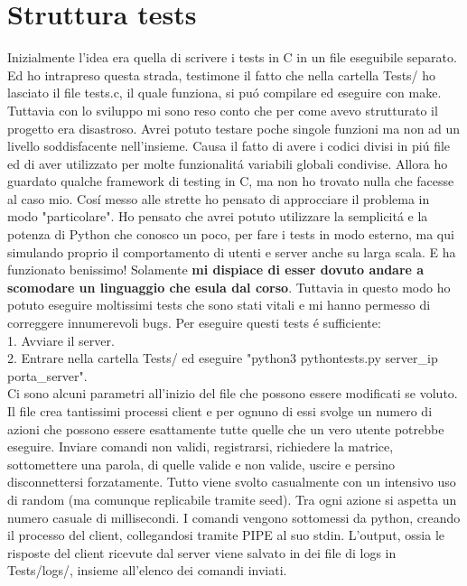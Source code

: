 \chapter{Struttura tests}{\label{ch:strutturatests}}
Inizialmente l'idea era quella di scrivere i tests in C in un file eseguibile separato. Ed ho intrapreso questa strada, testimone il fatto che nella cartella Tests/ ho lasciato il file tests.c, il quale funziona, si pu\'o compilare ed eseguire con make. Tuttavia con lo sviluppo mi sono reso conto che per come avevo strutturato il progetto era disastroso. Avrei potuto testare poche singole funzioni ma non ad un livello soddisfacente nell'insieme. Causa il fatto di avere i codici divisi in pi\'u file ed di aver utilizzato per molte funzionalit\'a variabili globali condivise. Allora ho guardato qualche framework di testing in C, ma non ho trovato nulla che facesse al caso mio. Cos\'i messo alle strette ho pensato di approcciare il problema in modo "particolare". Ho pensato che avrei potuto utilizzare la semplicit\'a e la potenza di Python che conosco un poco, per fare i tests in modo esterno, ma qui simulando proprio il comportamento di utenti e server anche su larga scala. E ha funzionato benissimo! Solamente \textbf{mi dispiace di esser dovuto andare a scomodare un linguaggio che esula dal corso}. Tuttavia in questo modo ho potuto eseguire moltissimi tests che sono stati vitali e mi hanno permesso di correggere innumerevoli bugs. Per eseguire questi tests \'e sufficiente:
\\
1. Avviare il server.
\\
2. Entrare nella cartella Tests/ ed eseguire "python3 pythontests.py server\_ip porta\_server".
\\
Ci sono alcuni parametri all'inizio del file che possono essere modificati se voluto.
\\
Il file crea tantissimi processi client e per ognuno di essi svolge un numero di azioni che possono essere esattamente tutte quelle che un vero utente potrebbe eseguire. Inviare comandi non validi, registrarsi, richiedere la matrice, sottomettere una parola, di quelle valide e non valide, uscire e persino disconnettersi forzatamente. Tutto viene svolto casualmente con un intensivo uso di random (ma comunque replicabile tramite seed). Tra ogni azione si aspetta un numero casuale di millisecondi. I comandi vengono sottomessi da python, creando il processo del client, collegandosi tramite PIPE al suo stdin. L'output, ossia le risposte del client ricevute dal server viene salvato in dei file di logs in Tests/logs/, insieme all'elenco dei comandi inviati. 